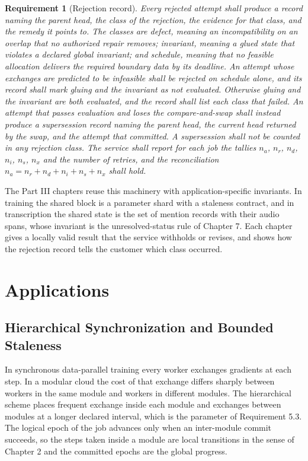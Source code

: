 \documentclass[11pt,openany]{book}
\newtheorem{requirement}{Requirement}[chapter]
\theoremstyle{remark}
\begin{document}
\begin{requirement}[Rejection record]
Every rejected attempt shall produce a record naming the parent head, the class of the rejection, the evidence for that class, and the remedy it points to. The classes are defect, meaning an incompatibility on an overlap that no authorized repair removes; invariant, meaning a glued state that violates a declared global invariant; and schedule, meaning that no feasible allocation delivers the required boundary data by its deadline. An attempt whose exchanges are predicted to be infeasible shall be rejected on schedule alone, and its record shall mark gluing and the invariant as not evaluated. Otherwise gluing and the invariant are both evaluated, and the record shall list each class that failed. An attempt that passes evaluation and loses the compare-and-swap shall instead produce a supersession record naming the parent head, the current head returned by the swap, and the attempt that committed. A supersession shall not be counted in any rejection class. The service shall report for each job the tallies $n_a$, $n_r$, $n_d$, $n_i$, $n_s$, $n_x$ and the number of retries, and the reconciliation $n_a=n_r+n_d+n_i+n_s+n_x$ shall hold.
\end{requirement}

The Part III chapters reuse this machinery with application-specific invariants. In training the shared block is a parameter shard with a staleness contract, and in transcription the shared state is the set of mention records with their audio spans, whose invariant is the unresolved-status rule of Chapter 7. Each chapter gives a locally valid result that the service withholds or revises, and shows how the rejection record tells the customer which class occurred.

\part{Applications}

\chapter[Synchronization and Staleness]{Hierarchical Synchronization and Bounded Staleness}

In synchronous data-parallel training every worker exchanges gradients at each step. In a modular cloud the cost of that exchange differs sharply between workers in the same module and workers in different modules. The hierarchical scheme places frequent exchange inside each module and exchanges between modules at a longer declared interval, which is the parameter of Requirement 5.3. The logical epoch of the job advances only when an inter-module commit succeeds, so the steps taken inside a module are local transitions in the sense of Chapter 2 and the committed epochs are the global progress.
\end{document}
